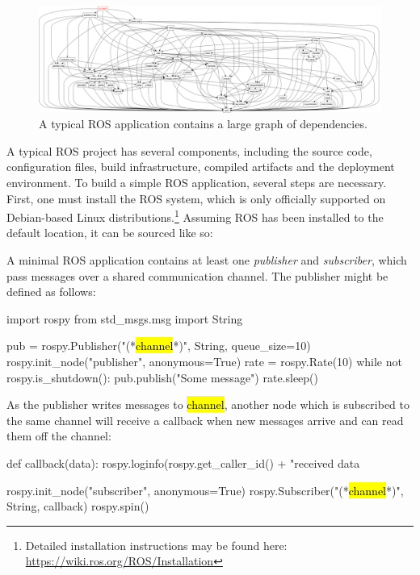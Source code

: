\documentclass[12pt,initial,twoside,maitrise]{dms}
\numberwithin{equation}{section}
\numberwithin{table}{chapter}
\numberwithin{figure}{chapter}
\begin{document}
\begin{figure}
\centering
\includegraphics[width=\textwidth]{../figures/rqt_dep_graph.png}
\caption{A typical ROS application contains a large graph of dependencies.}
\end{figure}

A typical ROS project has several components, including the source code, configuration files, build infrastructure, compiled artifacts and the deployment environment. To build a simple ROS application, several steps are necessary. First, one must install the ROS system, which is only officially supported on Debian-based Linux distributions.\hspace{-.08em}\footnote{Detailed installation instructions may be found here: \url{https://wiki.ros.org/ROS/Installation}}
%
Assuming ROS has been installed to the default location, it can be sourced like so:
%
%
A minimal ROS application contains at least one \textit{publisher} and \textit{subscriber}, which pass messages over a shared communication channel. The publisher might be defined as follows:
%
\begin{pythonlisting}[title=./catkin\_ws/src/pubsub/publisher.py]
import rospy
from std_msgs.msg import String

pub = rospy.Publisher("(*\hl{channel}*)", String, queue_size=10)
rospy.init_node("publisher", anonymous=True)
rate = rospy.Rate(10)
while not rospy.is_shutdown():
    pub.publish("Some message")
    rate.sleep()
\end{pythonlisting}
%
As the publisher writes messages to \hl{\ttfamily\small channel}, another node which is subscribed to the same channel will receive a callback when new messages arrive and can read them off the channel:
%
\begin{pythonlisting}[title=./catkin\_ws/src/pubsub/subscriber.py]
def callback(data):
    rospy.loginfo(rospy.get_caller_id() + "received data %

rospy.init_node("subscriber", anonymous=True)
rospy.Subscriber("(*\hl{channel}*)", String, callback)
rospy.spin()
\end{pythonlisting}
\end{document}
